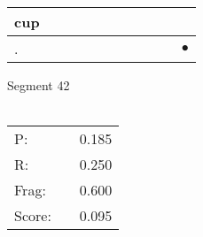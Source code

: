\documentclass[landscape]{article}
\newcommand{\ssp}{\hspace{2pt}}
\newcommand{\mex}{\cellcolor{g}$\bullet$}
\begin{document}
\begin{tabular}{|l|p{10pt}|p{10pt}|p{10pt}|p{10pt}|p{10pt}|p{10pt}|p{10pt}|p{10pt}|p{10pt}|p{10pt}|}
\hline
\ssp cup \ssp&\hspace{2pt}&\hspace{2pt}&\hspace{2pt}&\hspace{2pt}&\hspace{2pt}&\hspace{2pt}&\hspace{2pt}&\hspace{2pt}&\hspace{2pt}&\hspace{2pt}\\
\hline
\ssp \cellcolor{ref9}. \ssp&\hspace{2pt}&\hspace{2pt}&\hspace{2pt}&\hspace{2pt}&\hspace{2pt}&\hspace{2pt}&\hspace{2pt}&\hspace{2pt}&\hspace{2pt}&\hspace{2pt}\mex\\
\hline
\end{tabular}

\vspace{6pt}
\noindent Segment 42\\\\
\noindent\begin{tabular}{lm{12pt}r}
\hline
P:&&0.185\\
R:&&0.250\\
Frag:&&0.600\\
Score:&&0.095\\
\end{tabular}

\newpage
\end{document}
